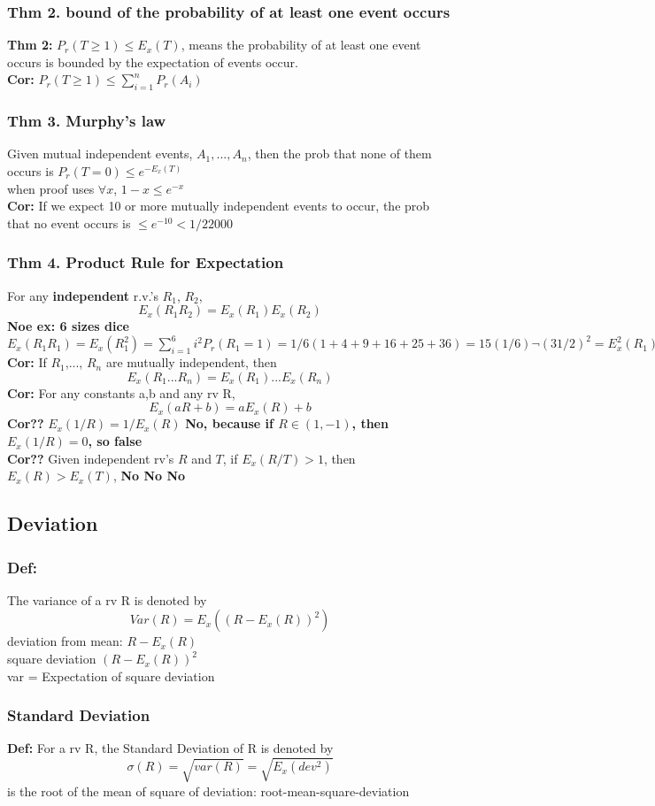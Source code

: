 \documentclass{article}
\begin{document}
\subsubsection{Thm 2. bound of the probability of at least one event occurs}
\textbf{Thm 2:} $P_r(T \geq 1) \leq E_x(T) $, means the probability of at least one event occurs is bounded by the expectation of events occur.  \\
\textbf{Cor:} $P_r(T \geq 1) \leq \sum_{i=1}^{n}P_r(A_i) $  \\

\subsubsection{Thm 3. Murphy's law}
Given mutual independent events, $A_1,..., A_n$, then the prob that none of them occurs is $P_r(T=0)\leq e^{-E_x(T)}$  \\
when proof uses $\forall x$, $1-x \leq e^{-x}$  \\
\textbf{Cor:} If we expect 10 or more mutually independent events to occur, the prob that no event occurs is $\leq e^{-10}<1/22000$  \\

\subsubsection{Thm 4. Product Rule for Expectation}
For any \textbf{independent} r.v.'s $R_1$, $R_2$, 
$$ E_x(R_1R_2)=E_x(R_1)E_x(R_2) $$
\textbf{Noe ex: 6 sizes dice} $E_x(R_1R_1)=E_x(R_1^2)=\sum_{i=1}^{6}i^2P_r(R_1=1)=1/6(1+4+9+16+25+36)=15(1/6)\neg (3 1/2)^2=E_x^2(R_1)$  \\
\textbf{Cor:} If  $R_1$,..., $R_n$ are mutually independent, then $$ E_x(R_1...R_n)=E_x(R_1)...E_x(R_n) $$
\textbf{Cor:} For any constants a,b and any rv R, $$ E_x(aR+b)=aE_x(R)+b $$
\textbf{Cor??} $E_x(1/R)=1/E_x(R)$  \textbf{No, because if $R\in(1,-1)$, then $E_x(1/R)=0$, so false} \\
\textbf{Cor??} Given independent rv's $R$ and $T$, if $E_x(R/T)>1$, then $E_x(R)>E_x(T)$,  \textbf{No No No} \\

\subsection{Deviation}
\subsubsection{Def:}
The variance of a rv R is denoted by $$Var(R)=E_x((R-E_x(R))^2)$$
deviation from mean: $R-E_x(R)$  \\
square deviation $(R-E_x(R))^2$  \\
var = Expectation of square deviation  \\
\subsubsection{Standard Deviation}
\textbf{Def:} For a rv R, the Standard Deviation of R is denoted by $$ \sigma(R)=\sqrt{var(R)}=\sqrt{E_x(dev^2)} $$
is the root of the mean of square of deviation:  root-mean-square-deviation
\end{document}
